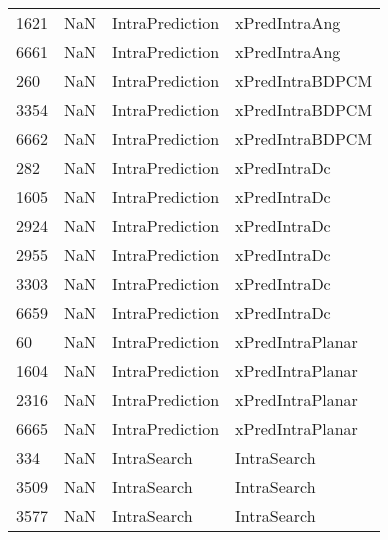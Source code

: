 \begin{tabular}{llll}
1621 &                   NaN &            IntraPrediction &                             xPredIntraAng \\
6661 &                   NaN &            IntraPrediction &                             xPredIntraAng \\
260  &                   NaN &            IntraPrediction &                           xPredIntraBDPCM \\
3354 &                   NaN &            IntraPrediction &                           xPredIntraBDPCM \\
6662 &                   NaN &            IntraPrediction &                           xPredIntraBDPCM \\
282  &                   NaN &            IntraPrediction &                              xPredIntraDc \\
1605 &                   NaN &            IntraPrediction &                              xPredIntraDc \\
2924 &                   NaN &            IntraPrediction &                              xPredIntraDc \\
2955 &                   NaN &            IntraPrediction &                              xPredIntraDc \\
3303 &                   NaN &            IntraPrediction &                              xPredIntraDc \\
6659 &                   NaN &            IntraPrediction &                              xPredIntraDc \\
60   &                   NaN &            IntraPrediction &                          xPredIntraPlanar \\
1604 &                   NaN &            IntraPrediction &                          xPredIntraPlanar \\
2316 &                   NaN &            IntraPrediction &                          xPredIntraPlanar \\
6665 &                   NaN &            IntraPrediction &                          xPredIntraPlanar \\
334  &                   NaN &                IntraSearch &                               IntraSearch \\
3509 &                   NaN &                IntraSearch &                               IntraSearch \\
3577 &                   NaN &                IntraSearch &                               IntraSearch \\

\end{tabular}
